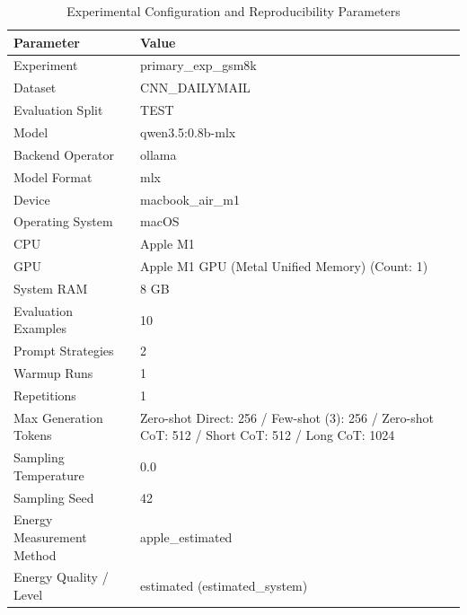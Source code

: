 \begin{table}
\caption{Experimental Configuration and Reproducibility Parameters}
\label{tab:experimental_configuration}
\begin{tabular}{ll}
\toprule
Parameter & Value \\
\midrule
Experiment & primary\_exp\_gsm8k \\
Dataset & CNN\_DAILYMAIL \\
Evaluation Split & TEST \\
Model & qwen3.5:0.8b-mlx \\
Backend Operator & ollama \\
Model Format & mlx \\
Device & macbook\_air\_m1 \\
Operating System & macOS \\
CPU & Apple M1 \\
GPU & Apple M1 GPU (Metal Unified Memory) (Count: 1) \\
System RAM & 8 GB \\
Evaluation Examples & 10 \\
Prompt Strategies & 2 \\
Warmup Runs & 1 \\
Repetitions & 1 \\
Max Generation Tokens & Zero-shot Direct: 256 / Few-shot (3): 256 / Zero-shot CoT: 512 / Short CoT: 512 / Long CoT: 1024 \\
Sampling Temperature & 0.0 \\
Sampling Seed & 42 \\
Energy Measurement Method & apple\_estimated \\
Energy Quality / Level & estimated (estimated\_system) \\
\bottomrule
\end{tabular}
\end{table}
